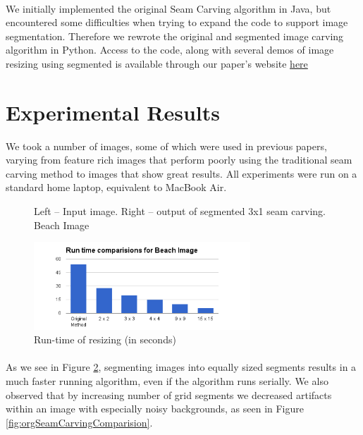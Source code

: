 \documentclass[conference]{acmsiggraph}
\begin{document}
\paragraph{}
We initially implemented the original Seam Carving algorithm in Java, but encountered some difficulties when trying to expand the code to support image segmentation. Therefore we rewrote the original and segmented image carving algorithm in Python. Access to the code, along with several demos of image resizing using segmented is available through our paper's website  \href{https://github.com/tomerwei/seamCarving/blob/master/paper/acmsiggraph/cs269.pdf?raw=true}{here}


\section{Experimental Results}

We took a number of images, some of which were used in previous papers, varying from feature rich images that perform poorly using the traditional seam carving method to images that show great results. All experiments were run on a standard home laptop, equivalent to MacBook Air.


\begin{figure}[!ht]       
    \caption{Left -- Input image. Right -- output of segmented 3x1 seam carving. Beach Image}
    \label{materialflowChart}
\end{figure}
\begin{figure}[!ht]
  \centering
  \includegraphics[width=3.2in]{images/beach}
  \caption{ Run-time of resizing (in seconds)}
  \label{fig:runtimes}
\end{figure}

\paragraph{}
As we see in Figure \ref{fig:runtimes}, segmenting images into equally sized segments results in a much faster running algorithm, even if the algorithm runs serially. We also observed that by increasing number of grid segments we decreased artifacts within an image with especially noisy backgrounds, as seen in Figure \ref{fig:orgSeamCarvingComparision}.
\end{document}
